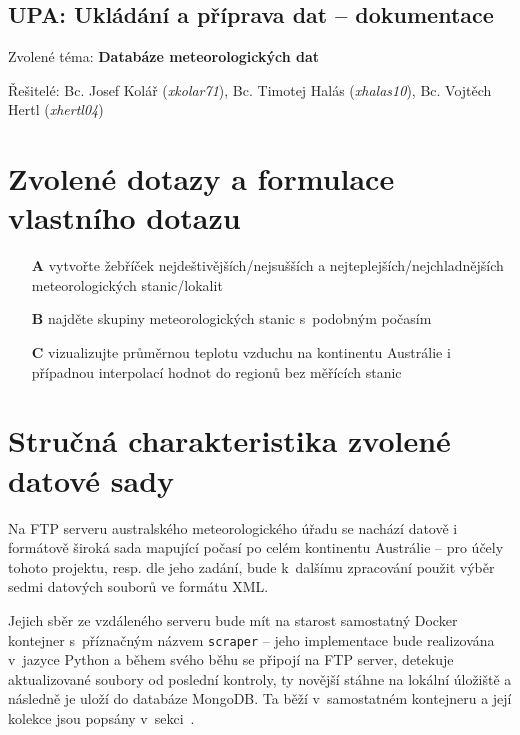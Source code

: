 \documentclass[10pt,a4paper,titlepage]{extarticle}
\begin{document}
    \begin{center}
        \section*{UPA: Ukládání a příprava dat -- dokumentace}
    \end{center}

    \large{Zvolené téma: \textbf{Databáze meteorologických dat}}

    \large{
    Řešitelé:
    Bc. Josef Kolář (\textit{xkolar71}),
    Bc. Timotej Halás (\textit{xhalas10}),
    Bc. Vojtěch Hertl (\textit{xhertl04})
    }%


    \section{Zvolené dotazy a formulace vlastního dotazu}
    \begin{itemize}
        \item[\textbf{A}] vytvořte žebříček nejdeštivějších/nejsušších a nejteplejších/nejchladnějších meteorologických stanic/lokalit
        \item[\textbf{B}] najděte skupiny meteorologických stanic s~podobným počasím
        \item[\textbf{C}] vizualizujte průměrnou teplotu vzduchu na kontinentu Austrálie i případnou interpolací hodnot
        do regionů bez měřících stanic
    \end{itemize}%


    \section{Stručná charakteristika zvolené datové sady}
    Na FTP serveru australského meteorologického úřadu se nachází datově i formátově široká sada mapující počasí po celém
    kontinentu Austrálie -- pro účely tohoto projektu, resp. dle jeho zadání, bude k~dalšímu zpracování použit výběr sedmi
    datových souborů ve formátu XML.

    Jejich sběr ze vzdáleného serveru bude mít na starost samostatný Docker kontejner s~příznačným názvem
    \texttt{scraper} -- jeho implementace bude realizována v~jazyce Python a během svého běhu se připojí na FTP server,
    detekuje aktualizované soubory od poslední kontroly, ty novější stáhne na lokální úložiště a následně je uloží
    do databáze MongoDB. Ta běží v~samostatném kontejneru a její kolekce jsou popsány
    v~sekci~.
\end{document}
